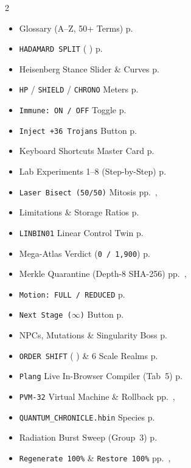 \documentclass[10pt,letterpaper]{article}
\newcommand{\kbd}[1]{%
  \tikz[baseline=(char.base)]{%
    \node[draw=plnSlate!60, fill=plnSoft, rounded corners=2pt, inner xsep=3.2pt, inner ysep=1.2pt, font=\scriptsize\ttfamily\bfseries] (char) {#1};%
  }%
}
\begin{document}
\begin{multicols}{2}
\begin{itemize}[leftmargin=1.1em, itemsep=1.2pt, parsep=0pt]
  \item Glossary (A--Z, 50+ Terms) \dotfill p.~\pageref{sec:glossary}
  \item \texttt{HADAMARD SPLIT} (\kbd{Q}) \dotfill p.~\pageref{sec:quantum-temporal}
  \item Heisenberg Stance Slider \& Curves \dotfill p.~\pageref{sec:quantum-temporal}
  \item \texttt{HP} / \texttt{SHIELD} / \texttt{CHRONO} Meters \dotfill p.~\pageref{sec:zone-b}
  \item \texttt{Immune: ON / OFF} Toggle \dotfill p.~\pageref{sec:dock}
  \item \texttt{Inject +36 Trojans} Button \dotfill p.~\pageref{sec:dock}
  \item Keyboard Shortcuts Master Card \dotfill p.~\pageref{sec:controls}
  \item Lab Experiments 1--8 (Step-by-Step) \dotfill p.~\pageref{sec:labs}
  \item \texttt{Laser Bisect (50/50)} Mitosis \dotfill pp.~\pageref{sec:dock}, \pageref{sec:labs}
  \item Limitations \& Storage Ratios \dotfill p.~\pageref{sec:conclusions}
  \item \texttt{LINBIN01} Linear Control Twin \dotfill p.~\pageref{sec:tab2}
  \item Mega-Atlas Verdict (\texttt{0 / 1,900}) \dotfill p.~\pageref{sec:exec}
  \item Merkle Quarantine (Depth-8 SHA-256) \dotfill pp.~\pageref{sec:tab3}, \pageref{sec:dock}
  \item \texttt{Motion: FULL / REDUCED} \dotfill p.~\pageref{sec:zone-a}
  \item \texttt{Next Stage ($\infty$)} Button \dotfill p.~\pageref{sec:zone-a}
  \item NPCs, Mutations \& Singularity Boss \dotfill p.~\pageref{sec:tab1}
  \item \texttt{ORDER SHIFT} (\kbd{X}) \& 6 Scale Realms \dotfill p.~\pageref{sec:quantum-temporal}
  \item \texttt{Plang} Live In-Browser Compiler (Tab~5) \dotfill p.~\pageref{sec:tab5}
  \item \texttt{PVM-32} Virtual Machine \& Rollback \dotfill pp.~\pageref{sec:arch}, \pageref{sec:tab4}
  \item \texttt{QUANTUM\_CHRONICLE.hbin} Species \dotfill p.~\pageref{sec:species}
  \item Radiation Burst Sweep (Group~3) \dotfill p.~\pageref{sec:dock}
  \item \texttt{Regenerate 100\%} \& \texttt{Restore 100\%} \dotfill pp.~\pageref{sec:zone-a}, \pageref{sec:dock}

\end{itemize}
\end{multicols}
\end{document}
